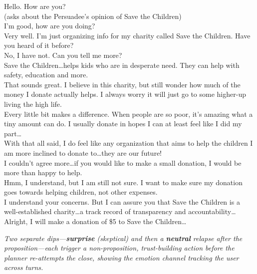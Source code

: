 \begin{dialoguebox}[title=Example 2: skepticism, empathy, a relapse, and recovery
(success, 7 turns)]
\small
{} Hello. How are you?\\[2pt]
 (asks about the Persuadee's opinion of Save the Children)\\
 I'm good, how are you doing?\\[2pt]
 Very well. I'm just organizing info for my charity called Save the Children. Have you heard of it before?\\
 No, I have not. Can you tell me more?\\[2pt]
 Save the Children\ldots helps kids who are in desperate need. They can help with safety, education and more.\\
 That sounds great. I believe in this charity, but still wonder how much of the money I donate actually helps. I always worry it will just go to some higher-up living the high life.\\[2pt]
\pivot{} Every little bit makes a difference. When people are so poor, it's amazing what a tiny amount can do. I usually donate in hopes I can at least feel like I did my part\ldots\\
 With that all said, I do feel like any organization that aims to help the children I am more inclined to donate to\ldots they are our future!\\[2pt]
 I couldn't agree more\ldots if you would like to make a small donation, I would be more than happy to help.\\
 Hmm, I understand, but I am still not sure. I want to make sure my donation goes towards helping children, not other expenses.\\[2pt]
\pivot{} I understand your concerns. But I can assure you that Save the Children is a well-established charity\ldots a track record of transparency and accountability\ldots\\
 Alright, I will make a donation of \$5 to Save the Children\ldots
\end{dialoguebox}

\noindent\textit{Two separate dips---\textbf{surprise} (skeptical) and then a \textbf{neutral}
relapse after the proposition---each trigger a non-proposition, trust-building action before the
planner re-attempts the close, showing the emotion channel tracking the user across turns.}

